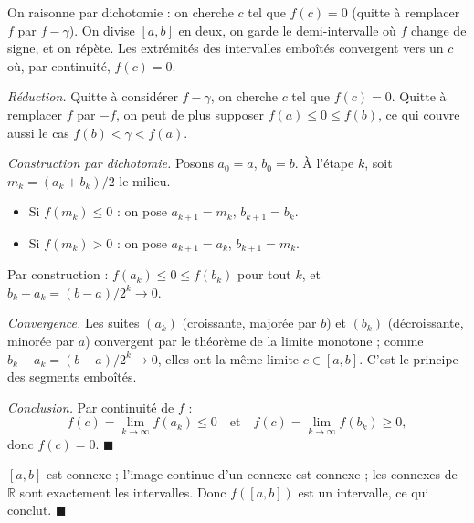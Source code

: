 \begin{ideepreuve}
On raisonne par dichotomie : on cherche $c$ tel que $f(c) = 0$ (quitte à
remplacer $f$ par $f - \gamma$). On divise $[a,b]$ en deux, on garde le
demi-intervalle où $f$ change de signe, et on répète. Les extrémités des
intervalles emboîtés convergent vers un $c$ où, par continuité, $f(c) = 0$.
\end{ideepreuve}


\begin{mdframed}[style=proofbar]
  \textit{Réduction.} Quitte à considérer $f - \gamma$, on cherche $c$ tel que
  $f(c) = 0$. Quitte à remplacer $f$ par $-f$, on peut
  de plus supposer $f(a) \leq 0 \leq f(b)$, ce qui couvre aussi le cas
  $f(b) < \gamma < f(a)$.

  \medskip
  \textit{Construction par dichotomie.} Posons $a_0 = a$, $b_0 = b$.
  À l'étape $k$, soit $m_k = (a_k + b_k)/2$ le milieu.
  \begin{itemize}
    \item Si $f(m_k) \leq 0$ : on pose $a_{k+1} = m_k$, $b_{k+1} = b_k$.
    \item Si $f(m_k) > 0$ : on pose $a_{k+1} = a_k$, $b_{k+1} = m_k$.
  \end{itemize}
  Par construction : $f(a_k) \leq 0 \leq f(b_k)$ pour tout $k$, et
  $b_k - a_k = (b-a)/2^k \to 0$.

  \medskip
  \textit{Convergence.} Les suites $(a_k)$ (croissante, majorée par $b$) et
  $(b_k)$ (décroissante, minorée par $a$) convergent par le théorème de la limite
  monotone ; comme $b_k - a_k = (b-a)/2^k \to 0$, elles ont la même limite
  $c \in [a,b]$. C'est le principe des segments emboîtés.

  \medskip
  \textit{Conclusion.} Par continuité de $f$ :
  \[
    f(c) = \lim_{k\to\infty} f(a_k) \leq 0
    \quad\text{et}\quad
    f(c) = \lim_{k\to\infty} f(b_k) \geq 0,
  \]
  donc $f(c) = 0$. \hfill$\blacksquare$
\end{mdframed}


\begin{mdframed}[style=proofbar]
  $[a,b]$ est connexe ; l'image continue
  d'un connexe est connexe ; les connexes de $\mathbb{R}$ sont exactement les
  intervalles. Donc $f([a,b])$ est un intervalle, ce qui conclut. \hfill$\blacksquare$
\end{mdframed}

